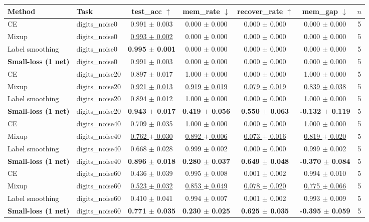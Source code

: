 \begin{tabular}{llccccc}
\toprule
Method & Task & test\_acc $\uparrow$ & mem\_rate $\downarrow$ & recover\_rate $\uparrow$ & mem\_gap $\downarrow$ & $n$ \\
\midrule
CE & digits\_noise0 & 0.991 $\pm$ 0.003 & 0.000 $\pm$ 0.000 & 0.000 $\pm$ 0.000 & 0.000 $\pm$ 0.000 & 5 \\
Mixup & digits\_noise0 & \underline{0.993 $\pm$ 0.002} & 0.000 $\pm$ 0.000 & 0.000 $\pm$ 0.000 & 0.000 $\pm$ 0.000 & 5 \\
Label smoothing & digits\_noise0 & \textbf{0.995 $\pm$ 0.001} & 0.000 $\pm$ 0.000 & 0.000 $\pm$ 0.000 & 0.000 $\pm$ 0.000 & 5 \\
\textbf{Small-loss (1 net)} & digits\_noise0 & 0.991 $\pm$ 0.003 & 0.000 $\pm$ 0.000 & 0.000 $\pm$ 0.000 & 0.000 $\pm$ 0.000 & 5 \\
\midrule
CE & digits\_noise20 & 0.897 $\pm$ 0.017 & 1.000 $\pm$ 0.000 & 0.000 $\pm$ 0.000 & 1.000 $\pm$ 0.000 & 5 \\
Mixup & digits\_noise20 & \underline{0.921 $\pm$ 0.013} & \underline{0.919 $\pm$ 0.019} & \underline{0.079 $\pm$ 0.019} & \underline{0.839 $\pm$ 0.038} & 5 \\
Label smoothing & digits\_noise20 & 0.894 $\pm$ 0.012 & 1.000 $\pm$ 0.000 & 0.000 $\pm$ 0.000 & 1.000 $\pm$ 0.000 & 5 \\
\textbf{Small-loss (1 net)} & digits\_noise20 & \textbf{0.943 $\pm$ 0.017} & \textbf{0.419 $\pm$ 0.056} & \textbf{0.550 $\pm$ 0.063} & \textbf{-0.132 $\pm$ 0.119} & 5 \\
\midrule
CE & digits\_noise40 & 0.709 $\pm$ 0.035 & 1.000 $\pm$ 0.000 & 0.000 $\pm$ 0.000 & 1.000 $\pm$ 0.000 & 5 \\
Mixup & digits\_noise40 & \underline{0.762 $\pm$ 0.030} & \underline{0.892 $\pm$ 0.006} & \underline{0.073 $\pm$ 0.016} & \underline{0.819 $\pm$ 0.020} & 5 \\
Label smoothing & digits\_noise40 & 0.668 $\pm$ 0.028 & 0.999 $\pm$ 0.002 & 0.000 $\pm$ 0.000 & 0.999 $\pm$ 0.002 & 5 \\
\textbf{Small-loss (1 net)} & digits\_noise40 & \textbf{0.896 $\pm$ 0.018} & \textbf{0.280 $\pm$ 0.037} & \textbf{0.649 $\pm$ 0.048} & \textbf{-0.370 $\pm$ 0.084} & 5 \\
\midrule
CE & digits\_noise60 & 0.436 $\pm$ 0.039 & 0.995 $\pm$ 0.008 & 0.001 $\pm$ 0.002 & 0.994 $\pm$ 0.010 & 5 \\
Mixup & digits\_noise60 & \underline{0.523 $\pm$ 0.032} & \underline{0.853 $\pm$ 0.049} & \underline{0.078 $\pm$ 0.020} & \underline{0.775 $\pm$ 0.066} & 5 \\
Label smoothing & digits\_noise60 & 0.410 $\pm$ 0.041 & 0.994 $\pm$ 0.007 & 0.001 $\pm$ 0.002 & 0.993 $\pm$ 0.009 & 5 \\
\textbf{Small-loss (1 net)} & digits\_noise60 & \textbf{0.771 $\pm$ 0.035} & \textbf{0.230 $\pm$ 0.025} & \textbf{0.625 $\pm$ 0.035} & \textbf{-0.395 $\pm$ 0.059} & 5 \\
\bottomrule
\end{tabular}
